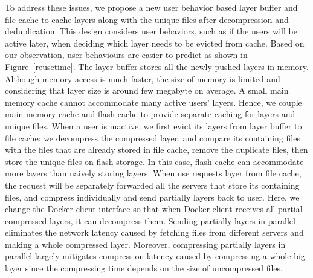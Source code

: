 To address these issues, we propose a new user behavior based layer buffer and 
file cache to cache layers along with the unique files after decompression and deduplication.
This design considers user behaviors, such as if the users will be active later, when deciding which layer needs to be evicted from cache.
Based on our observation, user behaviours are easier to predict as shown in Figure~\ref{reusetime}.
The layer buffer stores all the newly pushed layers in memory. 
Although memory access is much faster, the size of memory is limited and considering that layer size is around few megabyte on average.
A small main memory cache cannot accommodate many active users' layers.
Hence, we couple main memory cache and flash cache to provide separate caching for layers and unique files.
When a user is inactive, we first evict its layers from layer buffer to file cache: we decompress the compressed layer, and compare its containing files
with the files that are already stored in file cache, remove the duplicate files, then store the unique files on flash storage.
In this case, flash cache can accommodate more layers than naively storing layers.
When use requests layer from file cache, the request will be separately forwarded all the servers that store its containing files, and 
compress individually and send partially layers back to user. Here, we change the Docker client interface so that when Docker client receives all partial compressed layers,
it can decompress them. Sending partially layers in parallel eliminates the network latency caused by fetching files from different servers and making a whole compressed layer.
Moreover, compressing partially layers in parallel largely mitigates compression latency caused by compressing a whole big layer since the compressing time depends on the size of uncompressed files.

    





 
